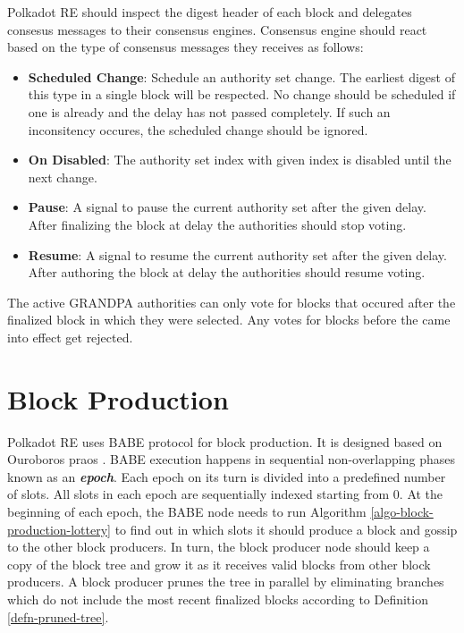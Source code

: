 \documentclass{book}
\newcommand{\tmem}[1]{{\em #1\/}}
\newcommand{\tmstrong}[1]{\textbf{#1}}
\newcommand{\tmtextbf}[1]{{\bfseries{#1}}}
\newcommand{\tmtextit}[1]{{\itshape{#1}}}
\newcommand{\tmtexttt}[1]{{\ttfamily{#1}}}
\newcommand{\tmverbatim}[1]{{\ttfamily{#1}}}
\newenvironment{itemizeminus}{\begin{itemize} \renewcommand{\labelitemi}{$-$}\renewcommand{\labelitemii}{$-$}\renewcommand{\labelitemiii}{$-$}\renewcommand{\labelitemiv}{$-$}}{\end{itemize}}
\providecommand{\tmem}[1]{\tmtextit{#1}}
\providecommand{\tmstrong}[1]{\tmtextbf{#1}}
\providecommand{\tmtextbf}[1]{\tmtextbf{#1}}
\providecommand{\tmtextit}[1]{\tmtextit{#1}}
\providecommand{\tmverbatim}[1]{\tmtexttt{#1}}
\begin{document}
Polkadot RE should inspect the digest header of each block and delegates
consesus messages to their consensus engines. Consensus engine should react
based on the type of consensus messages they receives as follows:
\begin{itemizeminus}
  \item {\tmstrong{Scheduled Change}}: Schedule an authority set change. The
  earliest digest of this type in a single block will be respected. No change
  should be scheduled if one is already and the delay has not passed
  completely. If such an inconsitency occures, the scheduled change should be
  ignored.
  
  \item {\tmstrong{On Disabled}}: The authority set index with given index is
  disabled until the next change.
  
  \item {\tmstrong{Pause}}: A signal to pause the current authority set after
  the given delay. After finalizing the block at delay the authorities should
  stop voting.
  
  \item {\tmstrong{Resume}}: A signal to resume the current authority set
  after the given delay. After authoring the block at delay the authorities
  should resume voting.
\end{itemizeminus}
The active GRANDPA authorities can only vote for blocks that occured after the
finalized block in which they were selected. Any votes for blocks before the
\tmverbatim{Scheduled Change} came into effect get rejected.

\section{Block Production}\label{sect-babe}\label{sect-block-production}

Polkadot RE uses BABE protocol {\cite{w3f_research_group_blind_2019}} for
block production. It is designed based on Ouroboros praos
{\cite{david_ouroboros_2018}}. BABE execution happens in sequential
non-overlapping phases known as an {\tmstrong{{\tmem{epoch}}}}. Each epoch on
its turn is divided into a predefined number of slots. All slots in each epoch
are sequentially indexed starting from 0. At the beginning of each epoch, the
BABE node needs to run Algorithm \ref{algo-block-production-lottery} to find
out in which slots it should produce a block and gossip to the other block
producers. In turn, the block producer node should keep a copy of the block
tree and grow it as it receives valid blocks from other block producers. A
block producer prunes the tree in parallel by eliminating branches which do
not include the most recent finalized blocks according to Definition
\ref{defn-pruned-tree}.
\end{document}
